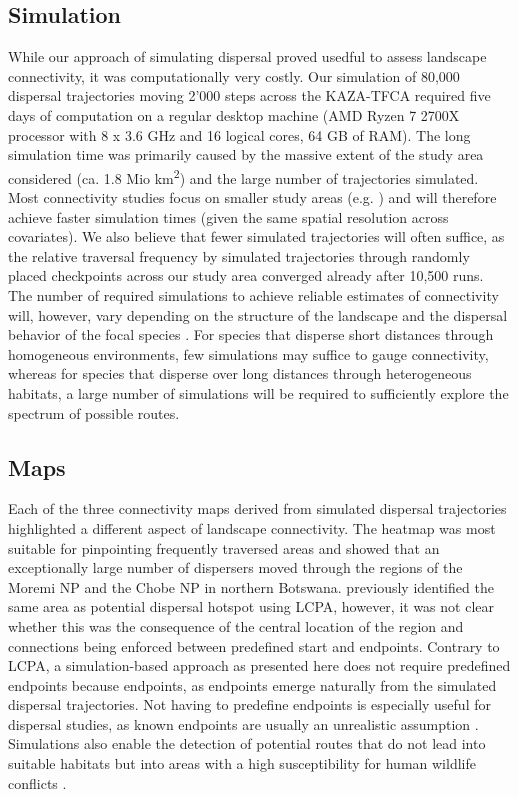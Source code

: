 \documentclass[abstract=on,10pt,a4paper,bibliography=totocnumbered]{article}
\begin{document}
\subsection{Simulation}
While our approach of simulating dispersal proved usedful to assess landscape
connectivity, it was computationally very costly. Our simulation of 80,000
dispersal trajectories moving 2'000 steps across the KAZA-TFCA required five
days of computation on a regular desktop machine (AMD Ryzen 7 2700X processor
with 8 x 3.6 GHz and 16 logical cores, 64 GB of RAM). The long simulation time
was primarily caused by the massive extent of the study area considered (ca. 1.8
Mio km\textsuperscript{2}) and the large number of trajectories simulated. Most
connectivity studies focus on smaller study areas (e.g. \citealp{Kanagaraj.2013,
Clark.2015, McClure.2016, Abrahms.2017, Zeller.2020}) and will therefore achieve
faster simulation times (given the same spatial resolution across covariates).
We also believe that fewer simulated trajectories will often suffice, as the
relative traversal frequency by simulated trajectories through randomly placed
checkpoints across our study area converged already after 10,500 runs. The
number of required simulations to achieve reliable estimates of connectivity
will, however, vary depending on the structure of the landscape and the
dispersal behavior of the focal species \citep{Gustafson.1996}. For species that
disperse short distances through homogeneous environments, few simulations may
suffice to gauge connectivity, whereas for species that disperse over long
distances through heterogeneous habitats, a large number of simulations will be
required to sufficiently explore the spectrum of possible routes.

\subsection{Maps}
Each of the three connectivity maps derived from simulated dispersal
trajectories highlighted a different aspect of landscape connectivity. The
heatmap was most suitable for pinpointing frequently traversed areas and showed
that an exceptionally large number of dispersers moved through the regions of
the Moremi NP and the Chobe NP in northern Botswana. \citep{Hofmann.2021}
previously identified the same area as potential dispersal hotspot using LCPA,
however, it was not clear whether this was the consequence of the central
location of the region and connections being enforced between predefined start
and endpoints. Contrary to LCPA, a simulation-based approach as presented here
does not require predefined endpoints because endpoints, as endpoints emerge
naturally from the simulated dispersal trajectories. Not having to predefine
endpoints is especially useful for dispersal studies, as known endpoints are
usually an unrealistic assumption \citep{Elliot.2014, Abrahms.2017, Cozzi.2020}.
Simulations also enable the detection of potential routes that do not lead into
suitable habitats \citep{Dwernychuk.1972, VanDerMeer.2014} but into areas with a
high susceptibility for human wildlife conflicts \citep{Cushman.2018}.
\end{document}
